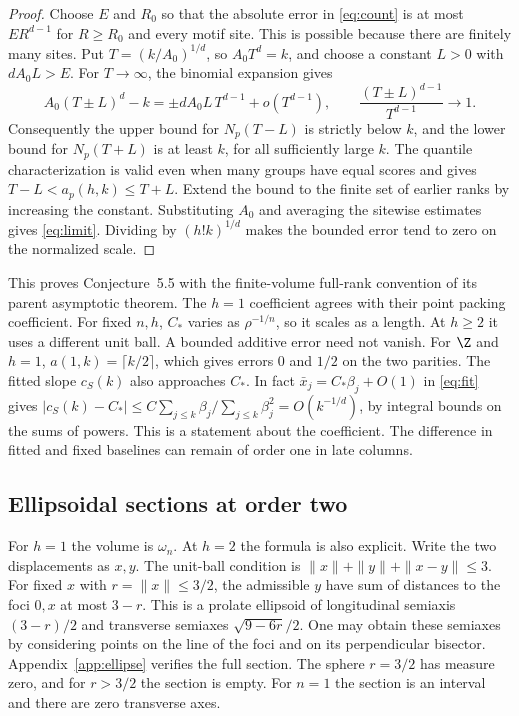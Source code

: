 \documentclass[11pt,a4paper]{article}
\theoremstyle{definition}
\begin{document}
\begin{proof}
Choose \(E\) and \(R_0\) so that the absolute error in \eqref{eq:count} is at most \(ER^{d-1}\) for \(R\ge R_0\) and every motif site. This is possible because there are finitely many sites. Put \(T=(k/A_0)^{1/d}\), so \(A_0T^d=k\), and choose a constant \(L>0\) with \(dA_0L>E\). For \(T\to\infty\), the binomial expansion gives
\[
A_0(T\pm L)^d-k=\pm dA_0L\,T^{d-1}+o(T^{d-1}),
\qquad \frac{(T\pm L)^{d-1}}{T^{d-1}}\longrightarrow1 .
\]
Consequently the upper bound for \(N_p(T-L)\) is strictly below \(k\), and the lower bound for \(N_p(T+L)\) is at least \(k\), for all sufficiently large \(k\). The quantile characterization is valid even when many groups have equal scores and gives \(T-L<a_p(h,k)\le T+L\). Extend the bound to the finite set of earlier ranks by increasing the constant. Substituting \(A_0\) and averaging the sitewise estimates gives \eqref{eq:limit}. Dividing by \((h!k)^{1/d}\) makes the bounded error tend to zero on the normalized scale.
\end{proof}

This proves Conjecture~5.5 \cite{wkhigher} with the finite-volume full-rank convention of its parent asymptotic theorem. The \(h=1\) coefficient agrees with their point packing coefficient. For fixed \(n,h\), \(C_*\) varies as \(\rho^{-1/n}\), so it scales as a length. At \(h\ge2\) it uses a different unit ball. A bounded additive error need not vanish. For \(\Z\) and \(h=1\), \(a(1,k)=\lceil k/2\rceil\), which gives errors \(0\) and \(1/2\) on the two parities. The fitted slope \(c_S(k)\) also approaches \(C_*\). In fact \(\bar x_j=C_*\beta_j+O(1)\) in \eqref{eq:fit} gives \(|c_S(k)-C_*|\le C\sum_{j\le k}\beta_j/\sum_{j\le k}\beta_j^2=O(k^{-1/d})\), by integral bounds on the sums of powers. This is a statement about the coefficient. The difference in fitted and fixed baselines can remain of order one in late columns.

\subsection{Ellipsoidal sections at order two}

For \(h=1\) the volume is \(\omega_n\). At \(h=2\) the formula is also explicit. Write the two displacements as \(x,y\). The unit-ball condition is \(\|x\|+\|y\|+\|x-y\|\le3\). For fixed \(x\) with \(r=\|x\|\le3/2\), the admissible \(y\) have sum of distances to the foci \(0,x\) at most \(3-r\). This is a prolate ellipsoid of longitudinal semiaxis \((3-r)/2\) and transverse semiaxes \(\sqrt{9-6r}/2\). One may obtain these semiaxes by considering points on the line of the foci and on its perpendicular bisector. Appendix~\ref{app:ellipse} verifies the full section. The sphere \(r=3/2\) has measure zero, and for \(r>3/2\) the section is empty. For \(n=1\) the section is an interval and there are zero transverse axes.
\end{document}
